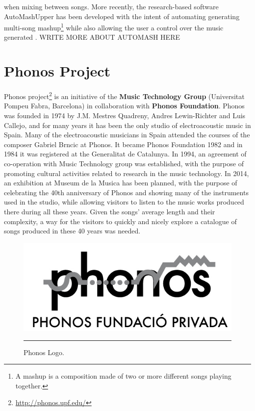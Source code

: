 when mixing between songs. More recently, the research-based software AutoMashUpper has been developed with the intent of automating generating multi-song mashup\footnote{A mashup is a composition made of two or more different songs playing together.} while also allowing the user a control over the music generated \cite{automash14}. WRITE MORE ABOUT AUTOMASH HERE


\section{Phonos Project}
Phonos project\footnote{\url{http://phonos.upf.edu/}} is an initiative of the \textbf{Music Technology Group} (Universitat Pompeu Fabra, Barcelona) in collaboration with \textbf{Phonos Foundation}. Phonos was founded in 1974 by J.M. Mestres Quadreny, Andres Lewin-Richter and Luis Callejo, and for many years it has been the only studio of electroacoustic music in Spain. Many of the electroacoustic musicians in Spain attended the courses of the composer Gabriel Brncic at Phonos. It became Phonos Foundation 1982 and in 1984 it was registered at the Generalitat de Catalunya. In 1994, an agreement of co-operation with Music Technology group was established, with the purpose of promoting cultural activities related to research in the music technology. 
In 2014, an exhibition at Museum de la Musica has been planned, with the purpose of celebrating the 40th anniversary of Phonos and showing many of the instruments used in the studio, while allowing visitors to listen to the music works produced there during all these years. Given the songs' average length and their complexity, a way for the visitors to quickly and nicely explore a catalogue of songs produced in these 40 years was needed.

\begin{figure}[htbp]
  \centering
    \includegraphics{Figures/phonos.png}
    \rule{35em}{0.5pt}
  \caption[Phonos]{Phonos Logo.}
  \label{fig:Phonos}
\end{figure}

